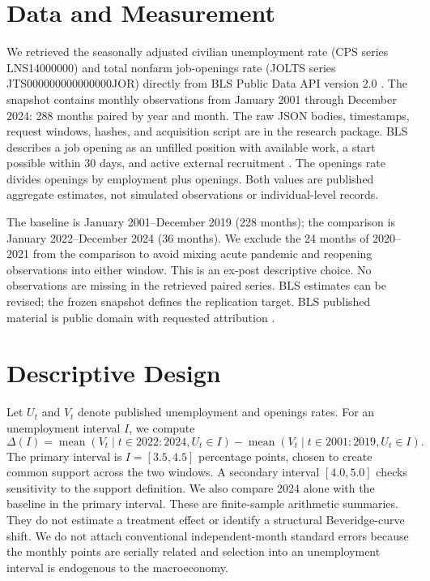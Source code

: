 \documentclass[10pt]{article}
\newcommand{\result}[2]{#2}
\begin{document}
\section{Data and Measurement}
We retrieved the seasonally adjusted civilian unemployment rate (CPS series LNS14000000) and total nonfarm job-openings rate (JOLTS series JTS000000000000000JOR) directly from BLS Public Data API version 2.0 \citep{BLSAPI,BLSChart}. The snapshot contains monthly observations from January 2001 through December 2024: \result{sample.months_all}{288} months paired by year and month. The raw JSON bodies, timestamps, request windows, hashes, and acquisition script are in the research package. BLS describes a job opening as an unfilled position with available work, a start possible within 30 days, and active external recruitment \citep{BLSDefinitions}. The openings rate divides openings by employment plus openings. Both values are published aggregate estimates, not simulated observations or individual-level records.

The baseline is January 2001--December 2019 (\result{sample.baseline_months}{228} months); the comparison is January 2022--December 2024 (\result{sample.comparison_months}{36} months). We exclude the \result{sample.excluded_transition_months}{24} months of 2020--2021 from the comparison to avoid mixing acute pandemic and reopening observations into either window. This is an ex-post descriptive choice. No observations are missing in the retrieved paired series. BLS estimates can be revised; the frozen snapshot defines the replication target. BLS published material is public domain with requested attribution \citep{BLSCopyright}.

\section{Descriptive Design}
Let $U_t$ and $V_t$ denote published unemployment and openings rates. For an unemployment interval $I$, we compute
\[
\Delta(I)=\operatorname{mean}(V_t\mid t\in 2022{:}2024, U_t\in I)
-\operatorname{mean}(V_t\mid t\in 2001{:}2019, U_t\in I).
\]
The primary interval is $I=[3.5,4.5]$ percentage points, chosen to create common support across the two windows. A secondary interval $[4.0,5.0]$ checks sensitivity to the support definition. We also compare 2024 alone with the baseline in the primary interval. These are finite-sample arithmetic summaries. They do not estimate a treatment effect or identify a structural Beveridge-curve shift. We do not attach conventional independent-month standard errors because the monthly points are serially related and selection into an unemployment interval is endogenous to the macroeconomy.
\end{document}
